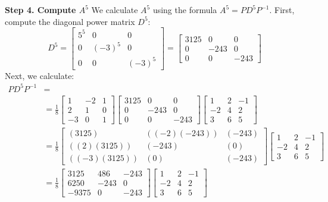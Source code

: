 \documentclass{article}
\begin{document}
\textbf{Step 4. Compute $A^{5}$}
We calculate $A^{5}$ using the formula $A^{5} = P D^{5} P^{-1}$.
First, compute the diagonal power matrix $D^{5}$:
\[
	D^{5} =
	\begin{bmatrix}
		5^5 & 0      & 0      \\
		0   & (-3)^5 & 0      \\
		0   & 0      & (-3)^5
	\end{bmatrix}
	=
	\begin{bmatrix}
		3125 & 0    & 0    \\
		0    & -243 & 0    \\
		0    & 0    & -243
	\end{bmatrix}
\]
Next, we calculate:
\begin{align*}
	PD^{5}P^{-1} & =             \\
	             & = \frac{1}{8}
	\begin{bmatrix}
		1  & -2 & 1 \\
		2  & 1  & 0 \\
		-3 & 0  & 1
	\end{bmatrix}
	\begin{bmatrix}
		3125 & 0    & 0 \\
		0    & -243 & 0
		\\ 0 & 0 & -243
	\end{bmatrix}
	\begin{bmatrix}
		1  & 2 & -1 \\
		-2 & 4 & 2  \\
		3  & 6 & 5
	\end{bmatrix}               \\
	             & = \frac{1}{8}
	\begin{bmatrix}
		(3125)       & ((-2)(-243)) & (-243) \\
		((2)(3125))  & (-243)       & (0)    \\
		((-3)(3125)) & (0)          & (-243)
	\end{bmatrix}
	\begin{bmatrix}
		1  & 2 & -1 \\
		-2 & 4 & 2  \\
		3  & 6 & 5
	\end{bmatrix}               \\
	             & = \frac{1}{8}
	\begin{bmatrix}
		3125  & 486  & -243 \\
		6250  & -243 & 0    \\
		-9375 & 0    & -243
	\end{bmatrix}
	\begin{bmatrix}
		1  & 2 & -1 \\
		-2 & 4 & 2  \\
		3  & 6 & 5
	\end{bmatrix}
\end{align*}
\end{document}
